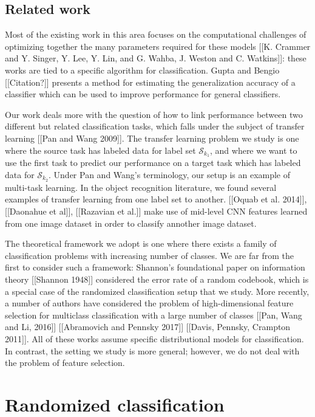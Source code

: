 \documentclass[twoside,11pt]{article}
\begin{document}
\subsection{Related work}

Most of the existing work in this area focuses on the computational challenges of optimizing together the many parameters required for these models [[K. Crammer and Y. Singer, Y. Lee, Y. Lin, and G. Wahba, J. Weston and C. Watkins]]: these works are tied to a specific algorithm for classification.  Gupta and Bengio [[Citation?]] presents a method for estimating the generalization accuracy of a classifier which can be used to improve performance for general classifiers.

Our work deals more with the question of how to link performance between two different but
related classification tasks, which falls under the subject of transfer learning [[Pan and Wang 2009]].
The transfer learning problem we study is one where the source task has labeled data for label set $\mathcal{S}_{k_1}$, and where we want to use the first task to predict our performance on a target task which has labeled data for $\mathcal{S}_{k_2}$.  Under Pan and Wang's terminology, our setup is an example of multi-task learning.  In the object recognition literature, we found several examples of transfer learning from one label set to another.  [[Oquab et al. 2014]], [[Daonahue et al]], [[Razavian et al.]] make use of mid-level CNN features learned from one image dataset in order to classify annother image dataset.

The theoretical framework we adopt is one where there exists a family of classification problems with increasing number of classes.  We are far from the first to consider such a framework: Shannon's foundational paper on information theory [[Shannon 1948]] considered the error rate of a random codebook, which is a special case of the randomized classification setup that we study.  More recently, a number of authors have considered the problem of high-dimensional feature selection for multiclass classification with a large number of classes [[Pan, Wang and Li, 2016]] [[Abramovich and Pennsky 2017]] [[Davis, Pennsky, Crampton 2011]].  All of these works assume specific distributional models for classification.  In contrast, the setting we study is more general; however, we do not deal with the problem of feature selection.




\section{Randomized classification}\label{sec:rc_motivation}
\end{document}
